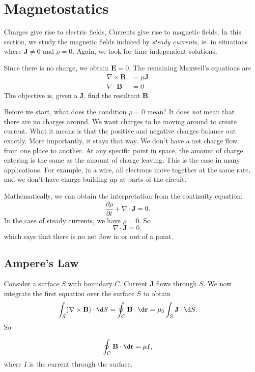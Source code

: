 \documentclass[a4paper]{article}
\begin{document}
\section{Magnetostatics}
Charges give rise to electric fields, Currents give rise to magnetic fields. In this section, we study the magnetic fields induced by \emph{steady currents}, ie. in situations where $\mathbf{J}\not= 0$ and $\rho = 0$. Again, we look for time-independent solutions.

Since there is no charge, we obtain $\mathbf{E} = 0$. The remaining Maxwell's equations are
\begin{align*}
  \nabla \times \mathbf{B} &= \mu \mathbf{J}\\
  \nabla\cdot \mathbf{B} &= 0
\end{align*}
The objective is, given a $\mathbf{J}$, find the resultant $\mathbf{B}$.

Before we start, what does the condition $\rho = 0$ mean? It does \emph{not} mean that there are no charges around. We want charges to be moving around to create current. What it means is that the positive and negative charges balance out exactly. More importantly, it stays that way. We don't have a net charge flow from one place to another. At any specific point in space, the amount of charge entering is the same as the amount of charge leaving. This is the case in many applications. For example, in a wire, all electrons move together at the same rate, and we don't have charge building up at parts of the circuit.

Mathematically, we can obtain the interpretation from the continuity equation:
\[
  \frac{\partial\rho}{\partial t} + \nabla \cdot \mathbf{J} = 0.
\]
In the case of steady currents, we have $\rho = 0$. So
\[
  \nabla\cdot \mathbf{J} = 0,
\]
which says that there is no net flow in or out of a point.
\subsection{Ampere's Law}
Consider a surface $S$ with boundary $C$. Current $\mathbf{J}$ flows through $S$. We now integrate the first equation over the surface $S$ to obtain
\[
  \int_S (\nabla\times \mathbf{B})\cdot \d S = \oint_C \mathbf{B}\cdot \d \mathbf{r} = \mu_0 \int_S \mathbf{J}\cdot \d S.
\]
So
\begin{law}
  \[
    \oint_C \mathbf{B}\cdot \d \mathbf{r} = \mu I,
  \]
  where $I$ is the current through the surface.
\end{law}
\end{document}
